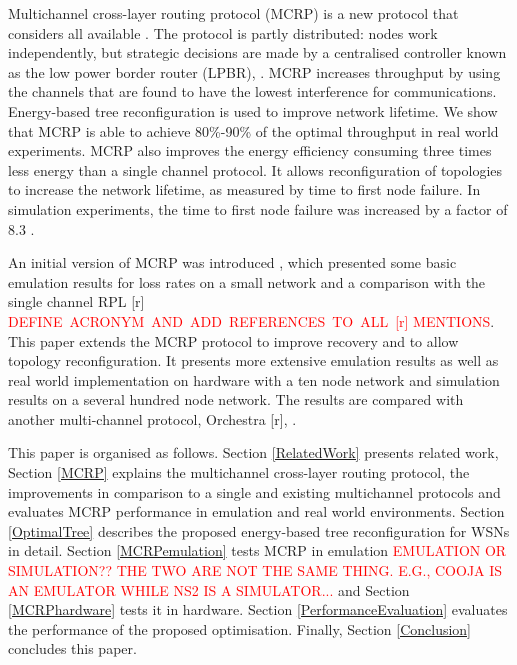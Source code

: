 Multichannel cross-layer routing protocol (MCRP) is a new protocol that considers all available . The protocol is partly distributed: nodes work independently, but strategic decisions are made by a centralised controller known as the low power border router (LPBR), . MCRP increases throughput by using the channels that are found to have the lowest interference for communications.
Energy-based tree reconfiguration is  used to improve network lifetime.  We show that MCRP is able to achieve 80\%-90\% of the optimal  throughput in real world experiments.
MCRP also improves the energy efficiency consuming three times less energy than a single channel protocol.  It allows reconfiguration of topologies to increase the network lifetime, as measured by time to first node failure.  In simulation experiments, the time to first node failure was increased by a factor of 8.3 .

An initial version of MCRP was introduced \cite{mcrp}, which presented some basic emulation results for loss rates on a small network and a comparison with the single channel RPL [r] \textcolor{red}{DEFINE\ ACRONYM\ AND\ ADD\ REFERENCES\ TO\ ALL\ [r] MENTIONS}.  This paper extends the MCRP protocol to improve recovery and to allow topology reconfiguration.  It presents more extensive emulation results as well as real world implementation on hardware with a ten node network and simulation results on a several hundred node network.  The results are compared with another multi-channel protocol, Orchestra [r], .

This paper is organised as follows. Section \ref{RelatedWork} presents  related work, Section \ref{MCRP} explains the multichannel cross-layer routing protocol, the improvements in comparison to a single and existing multichannel protocols and evaluates MCRP performance in emulation and real world environments.
Section \ref{OptimalTree} describes the proposed energy-based tree reconfiguration for WSNs in detail.  Section \ref{MCRPemulation} tests MCRP in emulation \textcolor{red}{EMULATION OR SIMULATION?? THE TWO ARE NOT THE SAME THING. E.G., COOJA IS AN EMULATOR WHILE NS2 IS A SIMULATOR...} and Section \ref{MCRPhardware} tests it in hardware.
Section \ref{PerformanceEvaluation} evaluates the performance of the proposed optimisation. Finally, Section \ref{Conclusion} concludes this paper.
